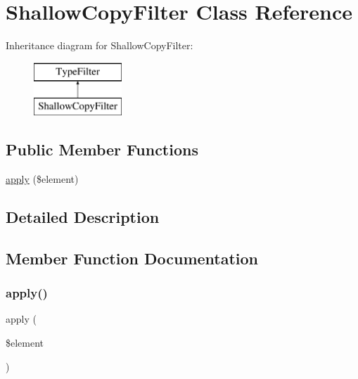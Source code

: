 \hypertarget{class_deep_copy_1_1_type_filter_1_1_shallow_copy_filter}{}\section{Shallow\+Copy\+Filter Class Reference}
\label{class_deep_copy_1_1_type_filter_1_1_shallow_copy_filter}
Inheritance diagram for Shallow\+Copy\+Filter\+:\begin{figure}[H]
\begin{center}
\leavevmode
\includegraphics[height=2.000000cm]{class_deep_copy_1_1_type_filter_1_1_shallow_copy_filter}
\end{center}
\end{figure}
\subsection*{Public Member Functions}
\begin{DoxyCompactItemize}
\item 
\mbox{\hyperlink{class_deep_copy_1_1_type_filter_1_1_shallow_copy_filter_a959e75f8f2b305dcf33633745c338176}{apply}} (\$element)
\end{DoxyCompactItemize}


\subsection{Detailed Description}


\subsection{Member Function Documentation}
\mbox{\label{class_deep_copy_1_1_type_filter_1_1_shallow_copy_filter_a959e75f8f2b305dcf33633745c338176}} 
\subsubsection{\texorpdfstring{apply()}{apply()}}
{\footnotesize\ttfamily apply (\begin{DoxyParamCaption}\item[{}]{\$element }\end{DoxyParamCaption})}


